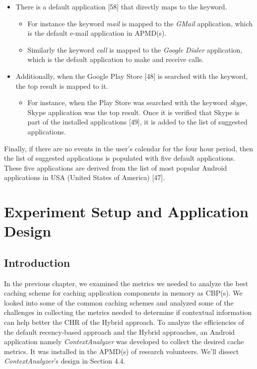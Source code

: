 \documentclass[12pt]{uthesis-v12}  %
\begin{document}
			\begin{itemize}
				
				\item There is a default application [58] that directly maps to the keyword.
					
					\begin{itemize}
						\item For instance the keyword {\em mail} is mapped to the {\em GMail} application, which is the default e-mail application in APMD(s).
						\item Similarly the keyword {\em call} is mapped to the {\em Google Dialer} application, which is the default application to make and receive calls.
					\end{itemize}
				
				\item Additionally, when the Google Play Store [48] is searched with the keyword, the top result is mapped to it.
					
					\begin{itemize}
						\item  For instance, when the Play Store was searched with the keyword {\em skype}, Skype application was the top result. Once it is verified that Skype is part of the installed applications [49], it is added to the list of suggested applications.
					\end{itemize}
					
			\end{itemize}

			Finally, if there are no events in the user's calendar for the four hour period, then the list of suggested applications is populated with five default applications. These five applications are derived from the list of most popular Android applications in USA (United States of America) [47].

\chapter{Experiment Setup and Application Design}
	
	\section{Introduction}
		In the previous chapter, we examined the metrics we needed to analyze the best caching scheme for caching application components in memory as CBP(s). We looked into some of the common caching schemes and analyzed some of the challenges in collecting the metrics needed to determine if contextual information can help better the CHR of the Hybrid approach. To analyze the efficiencies of the default recency-based approach and the Hybrid approaches, an Android application namely {\em ContextAnalyzer} was developed to collect the desired cache metrics. It was installed in the APMD(s) of research volunteers. We'll dissect {\em ContextAnalyzer}'s design in Section 4.4.  
		
\end{document}
